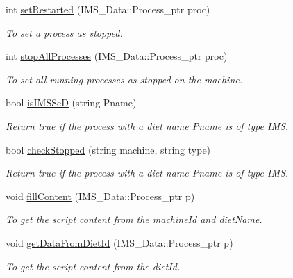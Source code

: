 \begin{DoxyCompactItemize}
int \hyperlink{classProcessServer_aef604927a5e7f2bb3996cdfb9bd08e29}{setRestarted} (IMS\_\-Data::Process\_\-ptr proc)
\begin{DoxyCompactList}\small\item\em To set a process as stopped. \item\end{DoxyCompactList}\item 
int \hyperlink{classProcessServer_aa6e4cc71dc1a94b3d85c375298908f37}{stopAllProcesses} (IMS\_\-Data::Process\_\-ptr proc)
\begin{DoxyCompactList}\small\item\em To set all running processes as stopped on the machine. \item\end{DoxyCompactList}\item 
bool \hyperlink{classProcessServer_a886644ab325e838721bd482582e25be3}{isIMSSeD} (string Pname)
\begin{DoxyCompactList}\small\item\em Return true if the process with a diet name Pname is of type IMS. \item\end{DoxyCompactList}\item 
bool \hyperlink{classProcessServer_aacc5b51b54c41ebfa0e08c739dd9f31e}{checkStopped} (string machine, string type)
\begin{DoxyCompactList}\small\item\em Return true if the process with a diet name Pname is of type IMS. \item\end{DoxyCompactList}\item 
void \hyperlink{classProcessServer_ad48bec4be2d70b61135aeb323b448e84}{fillContent} (IMS\_\-Data::Process\_\-ptr p)
\begin{DoxyCompactList}\small\item\em To get the script content from the machineId and dietName. \item\end{DoxyCompactList}\item 
void \hyperlink{classProcessServer_ab5c0b53b66a0c8d1ac26d477db6958cd}{getDataFromDietId} (IMS\_\-Data::Process\_\-ptr p)
\begin{DoxyCompactList}\small\item\em To get the script content from the dietId. \item\end{DoxyCompactList}\item 

\end{DoxyCompactItemize}
